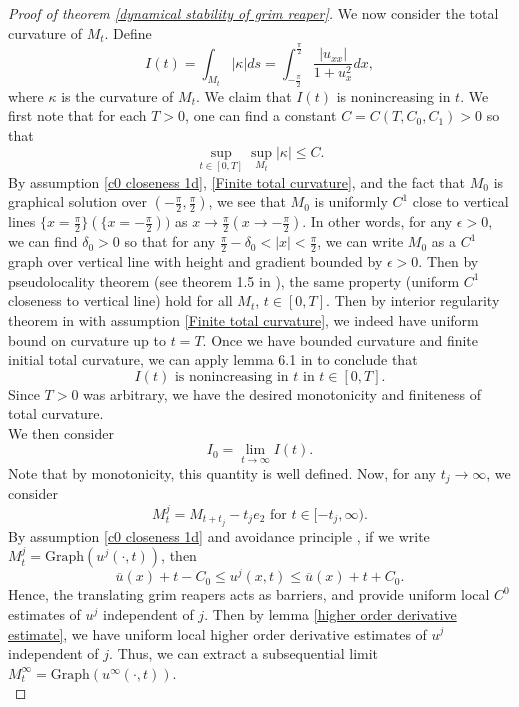 \documentclass[pdflatex,sn-mathphys-num]{sn-jnl}%
\begin{document}
\begin{proof}[Proof of theorem \ref{dynamical stability of grim reaper}]
We now consider the total curvature of $M_t$. Define
\begin{equation}\label{def of I}
    I(t) = \int_{M_t}|\kappa|ds = \int_{-\frac{\pi}{2}}^{\frac{\pi}{2}}\frac{|u_{xx}|}{1 + u_x^2}dx,
\end{equation}
where $\kappa$ is the curvature of $M_t$. We claim that $I(t)$ is nonincreasing in $t$. We first note that for each $T > 0$, one can find a constant $C = C(T, C_0, C_1) > 0$ so that
\begin{equation}\label{curvature bound up to any T}
    \sup_{t \in [0, T]}\sup_{M_t}|\kappa| \leq C.
\end{equation}
By assumption \eqref{c0 closeness 1d}, \eqref{Finite total curvature}, and the fact that $M_0$ is graphical solution over $(-\frac{\pi}{2}, \frac{\pi}{2})$, we see that $M_0$ is uniformly $C^1$ close to vertical lines $\{x = \frac{\pi}{2}\} (\{x = -\frac{\pi}{2}))$ as $x \to \frac{\pi}{2} (x \to -\frac{\pi}{2})$. In other words, for any $\epsilon > 0$, we can find $\delta_0 > 0$ so that for any $\frac{\pi}{2} - \delta_0 < |x| < \frac{\pi}{2}$, we can write $M_0$ as a $C^1$ graph over vertical line with height and gradient bounded by $\epsilon > 0$. Then by pseudolocality theorem (see theorem 1.5 in \cite{10.4310/jdg/1547607687}), the same property (uniform $C^1$ closeness to vertical line) hold for all $M_t$, $t \in [0, T]$. Then by interior regularity theorem in \cite{Ecker1991InteriorEF} with assumption \eqref{Finite total curvature}, we indeed have uniform bound on curvature up to $t = T$. Once we have bounded curvature and finite initial total curvature, we can apply lemma 6.1 in \cite{zhulectures} to conclude that 
\begin{equation}
    I(t) \text{ is nonincreasing in }t \text{ in }t \in [0, T].
\end{equation}
Since $T > 0$ was arbitrary, we have the desired monotonicity and finiteness of total curvature. \\

We then consider
\begin{equation}
    I_0 = \lim_{t \to \infty}I(t).
\end{equation}
Note that by monotonicity, this quantity is well defined. Now, for any $t_j \to \infty$, we consider
\begin{equation}
    M^j_t = M_{t + t_j} - t_je_2 \text{ for }t \in [-t_j, \infty).
\end{equation}
By assumption \eqref{c0 closeness 1d} and avoidance principle \cite{White2024TheAP}, if we write $M^j_t = \text{Graph}(u^j(\cdot, t))$, then
\begin{equation}\label{limit flow in between grims}
    \overline{u}(x) +t - C_0 \leq u^j(x,t) \leq \overline{u}(x) +t + C_0.
\end{equation}
Hence, the translating grim reapers acts as barriers, and provide uniform local $C^0$ estimates of $u^j$ independent of $j$. Then by lemma \ref{higher order derivative estimate}, we have uniform local higher order derivative estimates of $u^j$ independent of $j$. Thus, we can extract a subsequential limit $M^{\infty}_t = \text{Graph}(u^{\infty}(\cdot, t))$. \\


\end{proof}
\end{document}
